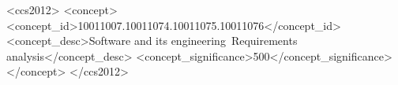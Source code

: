 \documentclass[sigconf,review]{acmart}
\begin{document}
\begin{CCSXML}
<ccs2012>
   <concept>
       <concept_id>10011007.10011074.10011075.10011076</concept_id>
       <concept_desc>Software and its engineering~Requirements analysis</concept_desc>
       <concept_significance>500</concept_significance>
       </concept>
 </ccs2012>
\end{CCSXML}



\maketitle
\end{document}
